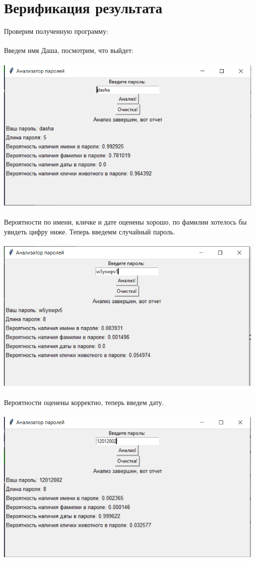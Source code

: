 \documentclass[a4paper,12pt]{article}
\begin{document}
\section{Верификация результата}
Проверим полученную программу:\\\\
Введем имя Даша, посмотрим, что выйдет:\\\\
\includegraphics[width=\linewidth]{image1.png}\\\\
Вероятности по имени, кличке и дате оценены хорошо, по фамилии хотелось бы увидеть цифру ниже. Теперь введемм случайный пароль.\\\\
\includegraphics[width=\linewidth]{image2.png}\\\\
Вероятности оценены корректно, теперь введем дату.\\\\
\includegraphics[width=\linewidth]{image3.png}\\\\
\end{document}
